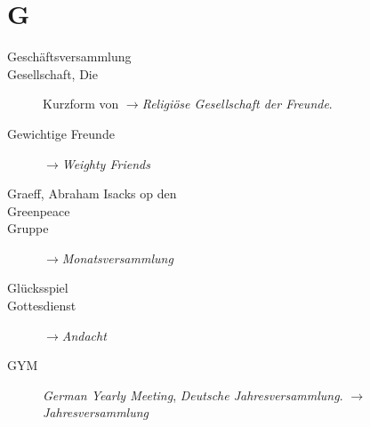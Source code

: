 \section*{G}

\articlesize

\begin{description}
 \item[Geschäftsversammlung]

 \item[Gesellschaft, Die] Kurzform von $\to$\textit{Religiöse Gesellschaft der Freunde}.

\item[Gewichtige Freunde] $\to$\textit{Weighty Friends}

 \item[Graeff, Abraham Isacks op den]

 \item[Greenpeace]

\item[Gruppe] $\to$\textit{Monatsversammlung}

\item[Glücksspiel]

\item[Gottesdienst] $\to$\textit{Andacht}

\item[GYM] \textit{German Yearly Meeting}, \textit{Deutsche Jahresversammlung}. $\to$\textit{Jahresversammlung}
 \end{description}

\normalsize